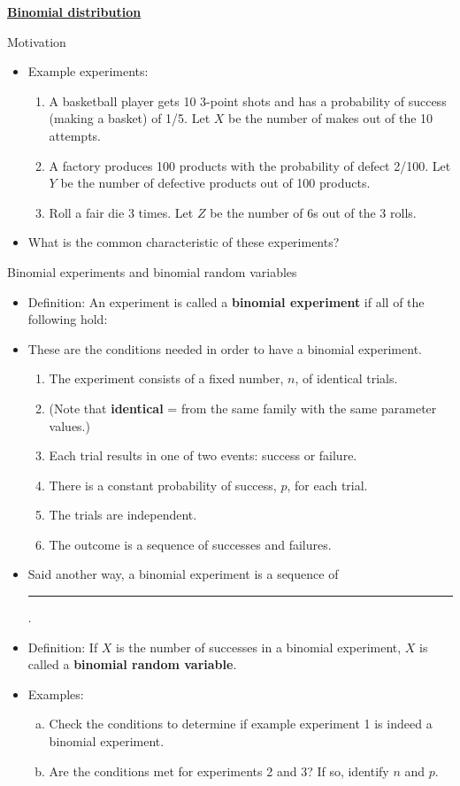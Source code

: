 \documentclass{article}
\newcommand{\bu}[1]{\textbf{\ul{#1}}}				%
\newcommand{\blankul}[1]{\rule[-1.5mm]{#1}{0.15mm}}	%
\begin{document}
\bu{Binomial distribution}\bigskip

Motivation\bigskip
\begin{itemize}
    \item Example experiments:
    \begin{enumerate}
        \item A basketball player gets 10 3-point shots and has a probability of success (making a basket) of 1/5. Let $X$ be the number of makes out of the 10 attempts.
        \item A factory produces 100 products with the probability of defect 2/100. Let $Y$ be the number of defective products out of 100 products.
        \item Roll a fair die 3 times. Let $Z$ be the number of 6s out of the 3 rolls.
    \end{enumerate}
    \item What is the common characteristic of these experiments?
\end{itemize}\bigskip

Binomial experiments and binomial random variables\bigskip
\begin{itemize}
    \item Definition: An experiment is called a \textbf{binomial experiment} if all of the following hold:\bigskip
    \item[] These are the conditions needed in order to have a binomial experiment.
    \begin{enumerate}
        \item The experiment consists of a fixed number, $n$, of identical trials.
        \item[] (Note that \textbf{identical} = from the same family with the same parameter values.)
        \item Each trial results in one of two events: success or failure.
        \item There is a constant probability of success, $p$, for each trial.
        \item The trials are independent.
        \item The outcome is a sequence of successes and failures.
    \end{enumerate}\bigskip
    \item[] Said another way, a binomial experiment is a sequence of \blankul{5cm}.
    \item Definition: If $X$ is the number of successes in a binomial experiment, $X$ is called a \textbf{binomial random variable}.\bigskip
    \item Examples:
    \begin{enumerate}[(a)]
        \item Check the conditions to determine if example experiment 1 is indeed a binomial experiment.\vspace{200pt}
        \item Are the conditions met for experiments 2 and 3? If so, identify $n$ and $p$.\vspace{50pt}
    \end{enumerate}
\end{itemize}\bigskip
\end{document}
